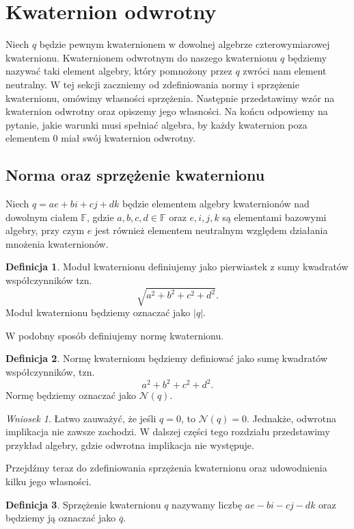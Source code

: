 \documentclass[a4paper,twoside,11pt,reqno]{mwrep}
\theoremstyle{plain} \newtheorem{twr}{Twierdzenie}
\theoremstyle{plain} \newtheorem{lem}{Lemat}
\theoremstyle{definition} \newtheorem{defi}{Definicja}
\theoremstyle{remark} \newtheorem*{wni}{Wniosek}
\theoremstyle{definition} \newtheorem{uwaga}{Uwaga}
\theoremstyle{definition}\newtheorem{prz}{Przykład}
\begin{document}
\section{Kwaternion odwrotny}

Niech $q$ będzie pewnym kwaternionem w dowolnej algebrze czterowymiarowej kwaternionu.
Kwaternionem odwrotnym do naszego kwaternionu $q$ będziemy nazywać taki element algebry, który
pomnożony przez $q$ zwróci nam element neutralny. %
W tej sekcji zaczniemy od zdefiniowania normy i sprzężenie kwaternionu, omówimy własności sprzężenia.
Następnie przedstawimy wzór na kwaternion odwrotny oraz opiszemy jego własności. 
Na końcu odpowiemy na pytanie, jakie warunki musi spełniać algebra, by każdy kwaternion
poza elementem $0$ miał swój kwaternion odwrotny.

\subsection{Norma oraz sprzężenie kwaternionu}

Niech $q = ae+bi+cj+dk$ będzie elementem algebry kwaternionów nad dowolnym ciałem 
$\mathbb{F}$, gdzie $a,b,c,d\in\mathbb{F}$ oraz $e,i,j,k$ są elementami bazowymi algebry, 
przy czym  $e$ jest również elementem neutralnym względem działania mnożenia kwaternionów. 
\begin{defi}
Moduł kwaternionu definiujemy jako pierwiastek z sumy kwadratów współczynników tzn.
$$\sqrt{a^2 +b^2+c^2+d^2}.$$
Moduł kwaternionu będziemy oznaczać jako $\vert q\vert$.
\end{defi}
W podobny sposób definiujemy normę kwaternionu.
\begin{defi} \label{NormaKwaternionu}
Normę kwaternionu będziemy definiować jako sumę kwadratów współczynników, tzn.
$$a^2 +b^2+c^2+d^2.$$
Normę będziemy oznaczać jako $\mathcal{N}(q)$.
\end{defi}

\begin{wni}
Łatwo zauważyć, że jeśli $q=0$, to  $\mathcal{N}(q) = 0$. Jednakże, odwrotna implikacja 
nie zawsze zachodzi. W dalszej części tego rozdziału przedstawimy przykład algebry, gdzie
odwrotna implikacja nie występuje.
\end{wni}

Przejdźmy teraz do zdefiniowania sprzężenia kwaternionu oraz udowodnienia kilku jego własności.

\begin{defi}
Sprzężenie kwaternionu $q$ nazywamy liczbę $ae-bi-cj-dk$ oraz będziemy ją oznaczać jako 
$\overline{q}$.
\end{defi}
\end{document}

